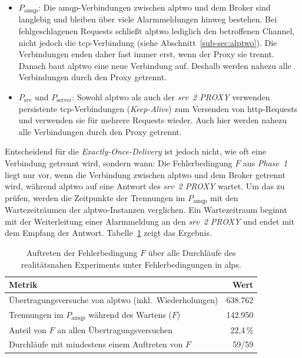 \begin{itemize}
    \item \textbf{$P_{\text{amqp}}$}: Die \gls{amqp}-Verbindungen zwischen \gls{alptwo} und dem Broker sind langlebig und bleiben über viele Alarmmeldungen hinweg bestehen. Bei fehlgeschlagenen Requests schließt \gls{alptwo} lediglich den betroffenen Channel, nicht jedoch die \gls{tcp}-Verbindung (siehe Abschnitt~\ref{sub-sec:alptwo}). Die Verbindungen enden daher fast immer erst, wenn der Proxy sie trennt. Danach baut \gls{alptwo} eine neue Verbindung auf. Deshalb werden nahezu alle Verbindungen durch den Proxy getrennt.

    \item \textbf{$P_{\text{srv}}$} und \textbf{$P_{\text{server}}$}: Sowohl \gls{alptwo} als auch der \textit{\gls{srv}~2 PROXY} verwenden persistente \gls{tcp}-Verbindungen (\textit{Keep-Alive}) zum Versenden von \gls{http}-Requests und verwenden sie für mehrere Requests wieder. Auch hier werden nahezu alle Verbindungen durch den Proxy getrennt.
\end{itemize}

\newpage

Entscheidend für die \textit{Exactly-Once-Delivery} ist jedoch nicht, wie oft eine Verbindung getrennt wird, sondern wann: Die Fehlerbedingung $F$ aus \textit{Phase~1} liegt nur vor, wenn die Verbindung zwischen \gls{alptwo} und dem Broker getrennt wird, während \gls{alptwo} auf eine Antwort des \textit{\gls{srv}~2 PROXY} wartet. Um das zu prüfen, werden die Zeitpunkte der Trennungen im $P_{\text{amqp}}$ mit den Wartezeiträumen der \gls{alptwo}-Instanzen verglichen. Ein Wartezeitraum beginnt mit der Weiterleitung einer Alarmmeldung an den \textit{\gls{srv}~2 PROXY} und endet mit dem Empfang der Antwort. Tabelle~\ref{tab:exp-alps-realistic-f} zeigt das Ergebnis.

\begin{table}[H]
    \centering
    \caption{Auftreten der Fehlerbedingung $F$ über alle Durchläufe des realitätsnahen Experiments unter Fehlerbedingungen in \acrshort{alps}.}
    \label{tab:exp-alps-realistic-f}
    \begin{tabular}{|l|r|}
        \hline
        \textbf{Metrik}                                              & \textbf{Wert} \\
        \hline
        Übertragungsversuche von \gls{alptwo} (inkl.~Wiederholungen) & 638.762       \\
        Trennungen im $P_{\text{amqp}}$ während des Wartens ($F$)    & 142.950       \\
        Anteil von $F$ an allen Übertragungsversuchen                & 22{,}4\,\%    \\
        Durchläufe mit mindestens einem Auftreten von $F$            & 59/59         \\
        \hline
    \end{tabular}
\end{table}

